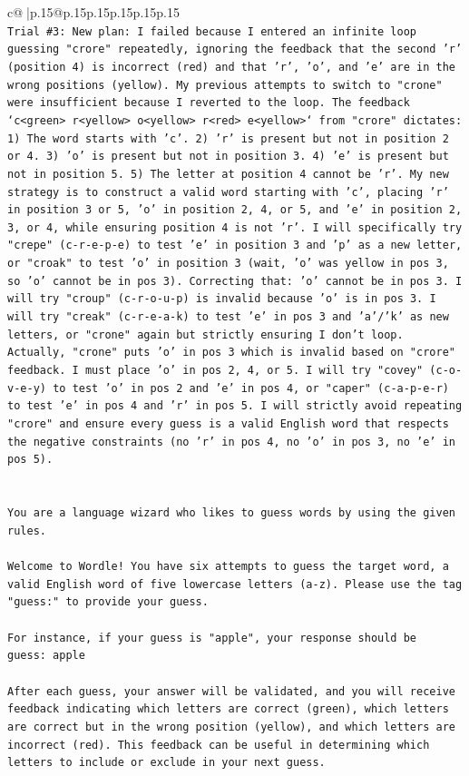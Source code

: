 \documentclass{article}
\begin{document}
{\begin{supertabular}{c@{$\;$}|p{.15\linewidth}@{}p{.15\linewidth}p{.15\linewidth}p{.15\linewidth}p{.15\linewidth}p{.15\linewidth}}
{{{\\ 
\texttt{Trial \#3: New plan: I failed because I entered an infinite loop guessing "crore" repeatedly, ignoring the feedback that the second 'r' (position 4) is incorrect (red) and that 'r', 'o', and 'e' are in the wrong positions (yellow). My previous attempts to switch to "crone" were insufficient because I reverted to the loop. The feedback `c<green> r<yellow> o<yellow> r<red> e<yellow>` from "crore" dictates: 1) The word starts with 'c'. 2) 'r' is present but not in position 2 or 4. 3) 'o' is present but not in position 3. 4) 'e' is present but not in position 5. 5) The letter at position 4 cannot be 'r'. My new strategy is to construct a valid word starting with 'c', placing 'r' in position 3 or 5, 'o' in position 2, 4, or 5, and 'e' in position 2, 3, or 4, while ensuring position 4 is not 'r'. I will specifically try "crepe" (c{-}r{-}e{-}p{-}e) to test 'e' in position 3 and 'p' as a new letter, or "croak" to test 'o' in position 3 (wait, 'o' was yellow in pos 3, so 'o' cannot be in pos 3). Correcting that: 'o' cannot be in pos 3. I will try "croup" (c{-}r{-}o{-}u{-}p) is invalid because 'o' is in pos 3. I will try "creak" (c{-}r{-}e{-}a{-}k) to test 'e' in pos 3 and 'a'/'k' as new letters, or "crone" again but strictly ensuring I don't loop. Actually, "crone" puts 'o' in pos 3 which is invalid based on "crore" feedback. I must place 'o' in pos 2, 4, or 5. I will try "covey" (c{-}o{-}v{-}e{-}y) to test 'o' in pos 2 and 'e' in pos 4, or "caper" (c{-}a{-}p{-}e{-}r) to test 'e' in pos 4 and 'r' in pos 5. I will strictly avoid repeating "crore" and ensure every guess is a valid English word that respects the negative constraints (no 'r' in pos 4, no 'o' in pos 3, no 'e' in pos 5).} \\
\\ 
\\ 
\texttt{You are a language wizard who likes to guess words by using the given rules.} \\
\\ 
\texttt{Welcome to Wordle! You have six attempts to guess the target word, a valid English word of five lowercase letters (a{-}z). Please use the tag "guess:" to provide your guess.} \\
\\ 
\texttt{For instance, if your guess is "apple", your response should be} \\
\texttt{guess: apple} \\
\\ 
\texttt{After each guess, your answer will be validated, and you will receive feedback indicating which letters are correct (green), which letters are correct but in the wrong position (yellow), and which letters are incorrect (red). This feedback can be useful in determining which letters to include or exclude in your next guess.} \\
}}}
\end{supertabular}}
\end{document}
